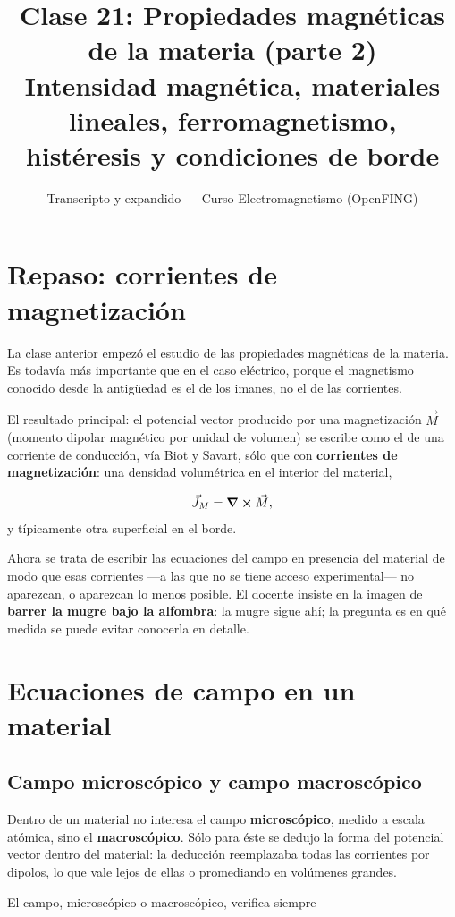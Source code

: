 \documentclass[12pt,a4paper]{article}
\title{\textbf{Clase 21: Propiedades magnéticas de la materia (parte 2)} \\[0.3em]
        \large{Intensidad magnética, materiales lineales, ferromagnetismo, histéresis y condiciones de borde}}
\author{Transcripto y expandido --- Curso Electromagnetismo (OpenFING)}
\date{}
\begin{document}
\maketitle
\thispagestyle{empty}
\newpage

\tableofcontents
\newpage

\section{Repaso: corrientes de magnetización}

La clase anterior empezó el estudio de las propiedades magnéticas de la
materia. Es todavía más importante que en el caso eléctrico, porque el
magnetismo conocido desde la antigüedad es el de los imanes, no el de las
corrientes.

El resultado principal: el potencial vector producido por una magnetización
$\vec M$ (momento dipolar magnético por unidad de volumen) se escribe como el
de una corriente de conducción, vía Biot y Savart, sólo que con \textbf{corrientes de
magnetización}: una densidad volumétrica en el interior del material,

\[
\vec J_M = \curl\vec M,
\]
y típicamente otra superficial en el borde.

Ahora se trata de escribir las ecuaciones del campo en presencia del material
de modo que esas corrientes ---a las que no se tiene acceso experimental--- no
aparezcan, o aparezcan lo menos posible. El docente insiste en la imagen de
\textbf{barrer la mugre bajo la alfombra}: la mugre sigue ahí; la pregunta es en qué
medida se puede evitar conocerla en detalle.

\section{Ecuaciones de campo en un material}

\subsection{Campo microscópico y campo macroscópico}

Dentro de un material no interesa el campo \textbf{microscópico}, medido a escala
atómica, sino el \textbf{macroscópico}. Sólo para éste se dedujo la forma del
potencial vector dentro del material: la deducción reemplazaba todas las
corrientes por dipolos, lo que vale lejos de ellas o promediando en volúmenes
grandes.

El campo, microscópico o macroscópico, verifica siempre
\end{document}

